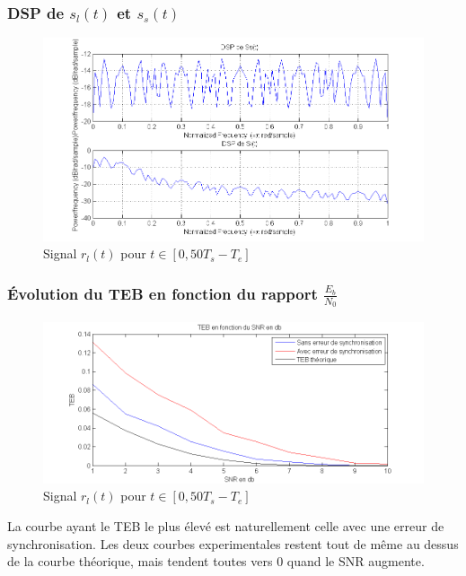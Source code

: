 \documentclass[11pt]{article}
\begin{document}
\newpage
		\subsubsection{DSP de $s_l(t)$ et $s_s(t)$}
			\begin{figure}[h]
				\centering
				\includegraphics[scale=0.5]{images/Q318-4.png}
				\caption{Signal $r_l(t)$ pour $t \in [0, 50T_s-T_e]$}
				\label{Q318-4}
			\end{figure}
		
		\subsubsection{Évolution du TEB en fonction du rapport $\frac{E_b}{N_0}$}
			\begin{figure}[!ht]
				\centering
				\includegraphics[scale=0.5]{images/Q318-5-6.png}
				\caption{Signal $r_l(t)$ pour $t \in [0, 50T_s-T_e]$}
				\label{Q318-5-6}
			\end{figure}
			La courbe ayant le TEB le plus élevé est naturellement celle avec une erreur de synchronisation. Les deux courbes experimentales restent tout de même au dessus de la courbe théorique, mais tendent toutes vers 0 quand le SNR augmente.		
		
\end{document}
